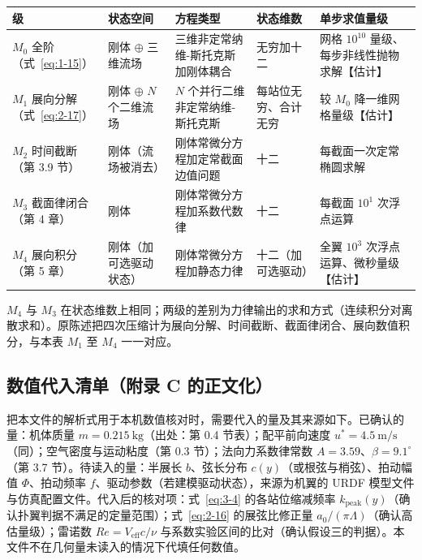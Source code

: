 \documentclass[11pt,a4paper]{ctexart}
\numberwithin{equation}{section}
\begin{document}
\begin{table}[htbp]
  \centering
  \small
  \begin{tabularx}{\textwidth}{@{} >{\raggedright\arraybackslash}p{2.6cm} >{\raggedright\arraybackslash}X >{\raggedright\arraybackslash}X >{\raggedright\arraybackslash}p{2.1cm} >{\raggedright\arraybackslash}X @{}}
    \toprule
    级 & 状态空间 & 方程类型 & 状态维数 & 单步求值量级 \\
    \midrule
    $M_0$ 全阶（式~\eqref{eq:1-15}） & 刚体 $\oplus$ 三维流场 & 三维非定常纳维-斯托克斯加刚体耦合 & 无穷加十二 & 网格 $10^{10}$ 量级、每步非线性抛物求解【估计】 \\
    $M_1$ 展向分解（式~\eqref{eq:2-17}） & 刚体 $\oplus$ $N$ 个二维流场 & $N$ 个并行二维非定常纳维-斯托克斯 & 每站位无穷、合计无穷 & 较 $M_0$ 降一维网格量级【估计】 \\
    $M_2$ 时间截断（第 3.9 节） & 刚体（流场被消去） & 刚体常微分方程加定常截面边值问题 & 十二 & 每截面一次定常椭圆求解 \\
    $M_3$ 截面律闭合（第 4 章） & 刚体 & 刚体常微分方程加系数代数律 & 十二 & 每截面 $10^1$ 次浮点运算 \\
    $M_4$ 展向积分（第 5 章） & 刚体（加可选驱动状态） & 刚体常微分方程加静态力律 & 十二（加可选驱动） & 全翼 $10^3$ 次浮点运算、微秒量级【估计】 \\
    \bottomrule
  \end{tabularx}
\end{table}

$M_4$ 与 $M_3$ 在状态维数上相同；两级的差别为力律输出的求和方式（连续积分对离散求和）。原陈述把四次压缩计为展向分解、时间截断、截面律闭合、展向数值积分，与本表 $M_1$ 至 $M_4$ 一一对应。

\subsection{数值代入清单（附录 C 的正文化）}

把本文件的解析式用于本机数值核对时，需要代入的量及其来源如下。已确认的量：机体质量 $m = 0.215\ \mathrm{kg}$（出处：第 0.4 节表）；配平前向速度 $u^* = 4.5\ \mathrm{m/s}$（同）；空气密度与运动粘度（第 0.3 节）；法向力系数律常数 $A = 3.59$、$\beta = 9.1^\circ$（第 3.7 节）。待读入的量：半展长 $b$、弦长分布 $c(y)$（或根弦与梢弦）、拍动幅值 $\Phi$、拍动频率 $f$、驱动参数（若建模驱动状态），来源为机翼的 URDF 模型文件与仿真配置文件。代入后的核对项：式~\eqref{eq:3-4} 的各站位缩减频率 $k_{\text{peak}}(y)$（确认扑翼判据不满足的定量范围）；式~\eqref{eq:2-16} 的展弦比修正量 $a_0/(\pi\Lambda)$（确认高估量级）；雷诺数 $Re = V_{\text{eff}} c/\nu$ 与系数实验区间的比对（确认假设三的判据）。本文件不在几何量未读入的情况下代填任何数值。
\end{document}

